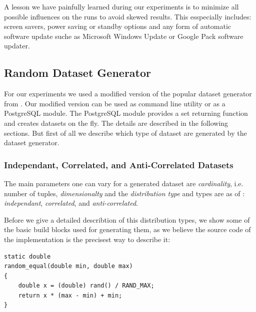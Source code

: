 A lesson we have painfully learned during our experiments is to
minimize all possible influences on the runs to avoid skewed
results. This esspecially includes: screen savers, power saving or
standby options and any form of automatic software update suche as
Microsoft Windows Update or Google Pack software updater.



\subsection{Random Dataset Generator}

For our experiments we used a modified version \citep{Eder2007a} of
the popular dataset generator from \citep{Borzsonyi2001}.  Our
modified version can be used as command line utility or as a
PostgreSQL module. The PostgreSQL module provides a set returning
function and creates datasets on the fly.  The details are described
in the following sections.  But first of all we describe which type of
dataset are generated by the dataset generator.

\subsubsection{Independant, Correlated, and Anti-Correlated Datasets}
\label{sec:corr-anti-indep}

The main parameters one can vary for a generated dataset are
\emph{cardinality}, i.e. number of tuples, \emph{dimensionalty} and
the \emph{distribution type} and types are as of \citep{Borzsonyi2001}: 
\emph{independant}, \emph{correlated}, and \emph{anti-correlated}.


Before we give a detailed describtion of this distribution types, we
show some of the basic build blocks used for generating them, as we
believe the source code of the implementation is the precisest way to
describe it:

\begin{lstlisting}
static double
random_equal(double min, double max)
{
	double x = (double) rand() / RAND_MAX;
	return x * (max - min) + min;
}
\end{lstlisting}

